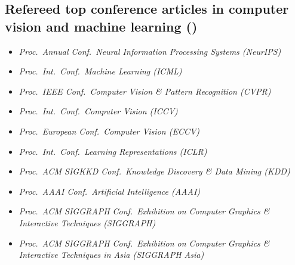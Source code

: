\documentclass[9pt, a4paper]{article}
\begin{document}
\subsection*{Refereed top conference articles in computer vision and machine learning (\unskip)
}
{
\begin{itemize}
  \itemsep -.12cm
\footnotesize
\item \emph{  Proc.\ Annual Conf.\ Neural Information Processing Systems (NeurIPS)}
\item \emph{  Proc.\ Int.\ Conf.\ Machine Learning (ICML)}
\item \emph{  Proc.\ IEEE Conf.\ Computer Vision \& Pattern Recognition (CVPR)}
\item \emph{  Proc.\ Int.\ Conf.\ Computer  Vision (ICCV)}
\item \emph{  Proc.\ European Conf.\ Computer Vision (ECCV)}
\item \emph{  Proc.\ Int.\ Conf.\ Learning Representations (ICLR)}
\item \emph{  Proc.\ ACM SIGKKD Conf.\   Knowledge Discovery \& Data Mining (KDD)}
%
\item \emph{  Proc.\ AAAI Conf.\ Artificial Intelligence (AAAI)}
%
\item \emph{  Proc.\ ACM SIGGRAPH Conf.\ Exhibition on Computer Graphics \& Interactive Techniques (SIGGRAPH)}
\item \emph{  Proc.\ ACM SIGGRAPH Conf.\ Exhibition on Computer Graphics \& Interactive Techniques in Asia (SIGGRAPH Asia)}
%
\end{itemize}
}


\noindent









\vspace{-0.15cm}
\end{document}
